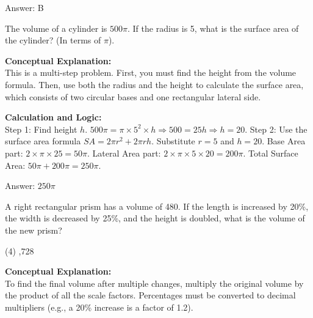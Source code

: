 \documentclass[11pt,paper=a4,answers]{exam}
\begin{document}
\begin{questions}
\begin{solution}
\vspace{30pt}

Answer: \colorbox{yellow!100}{B}
\end{solution}

\vspace{60pt}

\question
The volume of a cylinder is $500\pi$. If the radius is 5, what is the surface area of the cylinder? (In terms of $\pi$).

\begin{solution}
\textbf{Conceptual Explanation:} \\
This is a multi-step problem. First, you must find the height from the volume formula. Then, use both the radius and the height to calculate the surface area, which consists of two circular bases and one rectangular lateral side.

\vspace{30pt}

\textbf{Calculation and Logic:} \\
Step 1: Find height $h$. $500\pi = \pi \times 5^2 \times h \Rightarrow 500 = 25h \Rightarrow h = 20$. Step 2: Use the surface area formula $SA = 2\pi r^2 + 2\pi rh$. Substitute $r = 5$ and $h = 20$. Base Area part: $2 \times \pi \times 25 = 50\pi$. Lateral Area part: $2 \times \pi \times 5 \times 20 = 200\pi$. Total Surface Area: $50\pi + 200\pi = 250\pi$.

\vspace{30pt}

Answer: \colorbox{yellow!100}{$250\pi$}
\end{solution}

\vspace{60pt}

\question
A right rectangular prism has a volume of 480. If the length is increased by 20\%, the width is decreased by 25\%, and the height is doubled, what is the volume of the new prism?
\begin{tasks}(4)
    ,728
\end{tasks}

\begin{solution}
\textbf{Conceptual Explanation:} \\
To find the final volume after multiple changes, multiply the original volume by the product of all the scale factors. Percentages must be converted to decimal multipliers (e.g., a 20\% increase is a factor of 1.2).


\end{solution}
\end{questions}
\end{document}
